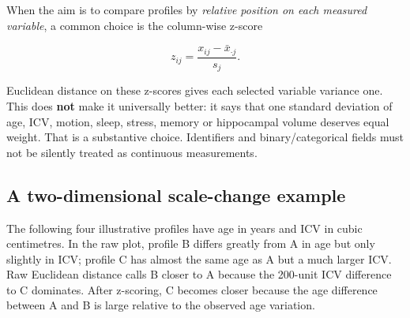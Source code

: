 \documentclass[
  english,
]{article}
\begin{document}
When the aim is to compare profiles by \emph{relative position on each
measured variable}, a common choice is the column-wise z-score

\[z_{ij}=\frac{x_{ij}-\bar{x}_{\cdot j}}{s_j}.\]

Euclidean distance on these z-scores gives each selected variable
variance one. This does \textbf{not} make it universally better: it says
that one standard deviation of age, ICV, motion, sleep, stress, memory
or hippocampal volume deserves equal weight. That is a substantive
choice. Identifiers and binary/categorical fields must not be silently
treated as continuous measurements.

\subsection{A two-dimensional scale-change
example}\label{a-two-dimensional-scale-change-example}

The following four illustrative profiles have age in years and ICV in
cubic centimetres. In the raw plot, profile B differs greatly from A in
age but only slightly in ICV; profile C has almost the same age as A but
a much larger ICV. Raw Euclidean distance calls B closer to A because
the 200-unit ICV difference to C dominates. After z-scoring, C becomes
closer because the age difference between A and B is large relative to
the observed age variation.
\end{document}
